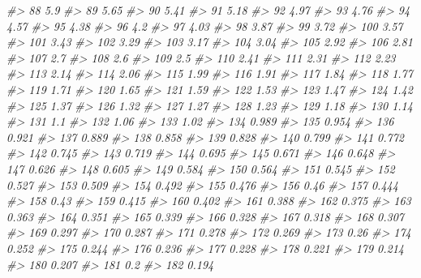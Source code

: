 \documentclass[]{book}
\newenvironment{Shaded}{\begin{snugshade}}{\end{snugshade}}
\newcommand{\CommentTok}[1]{\textcolor[rgb]{0.56,0.35,0.01}{\textit{#1}}}
\begin{document}
\begin{Shaded}
\begin{Highlighting}[]
\CommentTok{#> 88   5.9 }
\CommentTok{#> 89   5.65 }
\CommentTok{#> 90   5.41 }
\CommentTok{#> 91   5.18 }
\CommentTok{#> 92   4.97 }
\CommentTok{#> 93   4.76 }
\CommentTok{#> 94   4.57 }
\CommentTok{#> 95   4.38 }
\CommentTok{#> 96   4.2 }
\CommentTok{#> 97   4.03 }
\CommentTok{#> 98   3.87 }
\CommentTok{#> 99   3.72 }
\CommentTok{#> 100  3.57 }
\CommentTok{#> 101  3.43 }
\CommentTok{#> 102  3.29 }
\CommentTok{#> 103  3.17 }
\CommentTok{#> 104  3.04 }
\CommentTok{#> 105  2.92 }
\CommentTok{#> 106  2.81 }
\CommentTok{#> 107  2.7 }
\CommentTok{#> 108  2.6 }
\CommentTok{#> 109  2.5 }
\CommentTok{#> 110  2.41 }
\CommentTok{#> 111  2.31 }
\CommentTok{#> 112  2.23 }
\CommentTok{#> 113  2.14 }
\CommentTok{#> 114  2.06 }
\CommentTok{#> 115  1.99 }
\CommentTok{#> 116  1.91 }
\CommentTok{#> 117  1.84 }
\CommentTok{#> 118  1.77 }
\CommentTok{#> 119  1.71 }
\CommentTok{#> 120  1.65 }
\CommentTok{#> 121  1.59 }
\CommentTok{#> 122  1.53 }
\CommentTok{#> 123  1.47 }
\CommentTok{#> 124  1.42 }
\CommentTok{#> 125  1.37 }
\CommentTok{#> 126  1.32 }
\CommentTok{#> 127  1.27 }
\CommentTok{#> 128  1.23 }
\CommentTok{#> 129  1.18 }
\CommentTok{#> 130  1.14 }
\CommentTok{#> 131  1.1 }
\CommentTok{#> 132  1.06 }
\CommentTok{#> 133  1.02 }
\CommentTok{#> 134  0.989 }
\CommentTok{#> 135  0.954 }
\CommentTok{#> 136  0.921 }
\CommentTok{#> 137  0.889 }
\CommentTok{#> 138  0.858 }
\CommentTok{#> 139  0.828 }
\CommentTok{#> 140  0.799 }
\CommentTok{#> 141  0.772 }
\CommentTok{#> 142  0.745 }
\CommentTok{#> 143  0.719 }
\CommentTok{#> 144  0.695 }
\CommentTok{#> 145  0.671 }
\CommentTok{#> 146  0.648 }
\CommentTok{#> 147  0.626 }
\CommentTok{#> 148  0.605 }
\CommentTok{#> 149  0.584 }
\CommentTok{#> 150  0.564 }
\CommentTok{#> 151  0.545 }
\CommentTok{#> 152  0.527 }
\CommentTok{#> 153  0.509 }
\CommentTok{#> 154  0.492 }
\CommentTok{#> 155  0.476 }
\CommentTok{#> 156  0.46 }
\CommentTok{#> 157  0.444 }
\CommentTok{#> 158  0.43 }
\CommentTok{#> 159  0.415 }
\CommentTok{#> 160  0.402 }
\CommentTok{#> 161  0.388 }
\CommentTok{#> 162  0.375 }
\CommentTok{#> 163  0.363 }
\CommentTok{#> 164  0.351 }
\CommentTok{#> 165  0.339 }
\CommentTok{#> 166  0.328 }
\CommentTok{#> 167  0.318 }
\CommentTok{#> 168  0.307 }
\CommentTok{#> 169  0.297 }
\CommentTok{#> 170  0.287 }
\CommentTok{#> 171  0.278 }
\CommentTok{#> 172  0.269 }
\CommentTok{#> 173  0.26 }
\CommentTok{#> 174  0.252 }
\CommentTok{#> 175  0.244 }
\CommentTok{#> 176  0.236 }
\CommentTok{#> 177  0.228 }
\CommentTok{#> 178  0.221 }
\CommentTok{#> 179  0.214 }
\CommentTok{#> 180  0.207 }
\CommentTok{#> 181  0.2 }
\CommentTok{#> 182  0.194 }

\end{Highlighting}
\end{Shaded}
\end{document}
